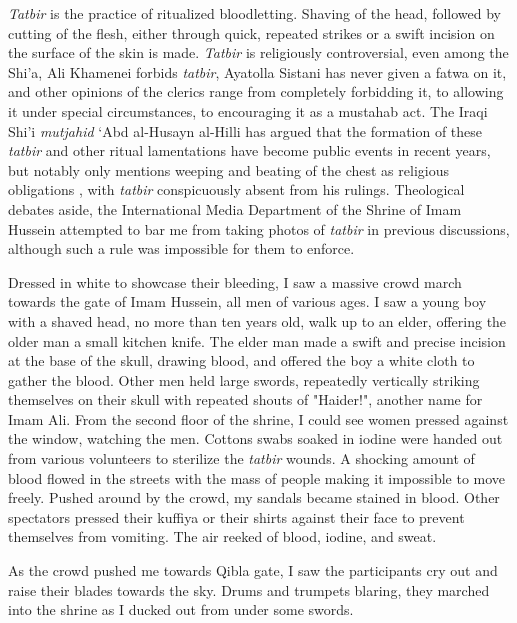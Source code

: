\emph{Tatbir} is the practice of ritualized bloodletting. Shaving of the head, followed by cutting of the flesh, either through quick, repeated strikes or a swift incision on the surface of the skin is made. \emph{Tatbir} is religiously controversial, even among the Shi'a, Ali Khamenei forbids \emph{tatbir}, Ayatolla Sistani has never given a fatwa on it, and other opinions of the clerics range from completely forbidding it, to allowing it under special circumstances, to encouraging it as a mustahab act. The Iraqi Shi'i \emph{mutjahid} ‘Abd al-Husayn al-Hilli has argued that the formation of these \emph{tatbir} and other ritual lamentations have become public events in recent years, but notably only mentions weeping and beating of the chest as religious obligations \cite[85]{weiss_shadow_2010}, with \emph{tatbir} conspicuously absent from his rulings. Theological debates aside, the International Media Department of the Shrine of Imam Hussein attempted to bar me from taking photos of \emph{tatbir} in previous discussions, although such a rule was impossible for them to enforce. 

Dressed in white to showcase their bleeding, I saw a massive crowd march towards the gate of Imam Hussein, all men of various ages. I saw a young boy with a shaved head, no more than ten years old, walk up to an elder, offering the older man a small kitchen knife. The elder man made a swift and precise incision at the base of the skull, drawing blood, and offered the boy a white cloth to gather the blood. Other men held large swords, repeatedly vertically striking themselves on their skull with repeated shouts of "Haider!", another name for Imam Ali. From the second floor of the shrine, I could see women pressed against the window, watching the men. Cottons swabs soaked in iodine were handed out from various volunteers to sterilize the \emph{tatbir} wounds. A shocking amount of blood flowed in the streets with the mass of people making it impossible to move freely. Pushed around by the crowd, my sandals became stained in blood. Other spectators pressed their kuffiya or their shirts against their face to prevent themselves from vomiting. The air reeked of blood, iodine, and sweat. 

As the crowd pushed me towards Qibla gate, I saw the participants cry out and raise their blades towards the sky. Drums and trumpets blaring, they marched into the shrine as I ducked out from under some swords.

